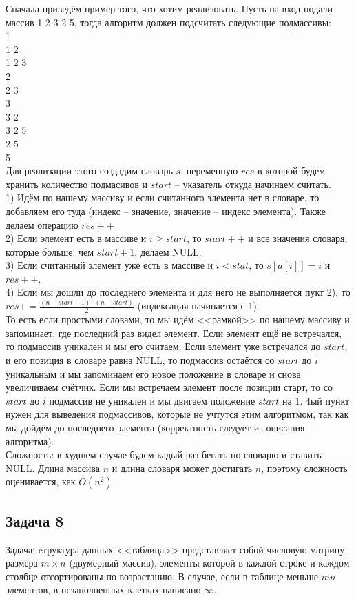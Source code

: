 \documentclass[a4paper,12pt]{article} %
\begin{document}
Сначала приведём пример того, что хотим реализовать. Пусть на вход подали массив 1 2 3 2 5, тогда алгоритм должен подсчитать следующие подмассивы:\\
1 \\ 1 2\\ 1 2 3\\ 2 \\ 2 3 \\ 3 \\ 3 2 \\ 3 2 5 \\ 2 5 \\ 5\\
Для реализации этого создадим словарь $ s $, переменную $ res $ в которой будем хранить количество подмасивов и $ start $ -- указатель откуда начинаем считать.\\
1) Идём по нашему массиву и если считанного элемента нет в словаре, то добавляем его туда (индекс -- значение, значение -- индекс элемента). Также делаем операцию $ res ++ $\\
2) Если элемент есть в массиве и $ i \geq start $, то $ start++ $ и все значения словаря, которые больше, чем $ start + 1 $, делаем NULL.\\
3) Если считанный элемент уже есть в массиве и $ i < stat$, то $s[a[i]] = i$ и $ res++ $.\\
4) Если мы дошли до последнего элемента и для него не выполняется пукт 2), то $res += \frac{(n -start - 1) \cdot (n-start)}{2}$ (индексация начинается с 1).\\
То есть если простыми словами, то мы идём <<рамкой>> по нашему массиву и запоминает, где последний раз видел элемент. Если элемент ещё не встречался, то подмассив уникален и мы его считаем. Если элемент уже встречался до $ start$, и его позиция в словаре равна NULL, то подмассив остаётся со $ start $ до $ i $ уникальным и мы запоминаем его новое положение в словаре и снова увеличиваем счётчик. Если мы встречаем элемент после позиции старт, то со $ start $ до $ i $ подмассив не уникален и мы двигаем положение $ start $ на 1. 4ый пункт нужен для выведения подмассивов, которые не учтутся этим алгоритмом, так как мы дойдём до последнего элемента (корректность следует из описания алгоритма).\\
Сложность: в худшем случае будем кадый раз бегать по словарю и ставить NULL. Длина массива $ n $ и длина словаря может достигать $ n $, поэтому сложность оценивается, как $ O(n^2) $.

\subsection*{Задача 8}
Задача: cтруктура данных <<таблица>> представляет собой числовую матрицу размера $m\times n$ (двумерный массив), элементы которой в каждой строке и каждом столбце отсортированы по возрастанию. В случае, если в таблице меньше $mn$ элементов, в незаполненных клетках написано $\infty$. \\
\end{document}
